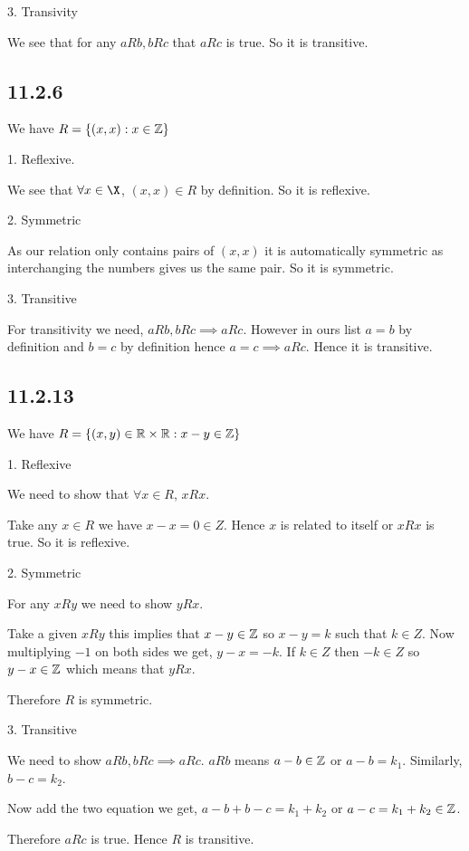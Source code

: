 \documentclass[a4paper]{report}
\begin{document}
3. Transivity

We see that for any $aRb, bRc$  that $aRc$ is true. So it is transitive. 


\subsection*{11.2.6}
We have $R = \{(x,x): x \in \mathbb{Z}\}$

1. Reflexive.

We see that  $\forall x \in \X$, $(x,x) \in R$ by definition. So it is reflexive.

2. Symmetric

As our relation only contains pairs of $(x,x)$ it is automatically symmetric as interchanging the numbers gives us the same pair. So it is symmetric.

3. Transitive

For transitivity we need, $aRb, bRc \implies aRc$. However in ours list $a = b$ by definition and $b = c$ by definition hence $a= c \implies aRc$. Hence it is transitive.

\subsection*{11.2.13}
We have $R = \{(x,y) \in \mathbb{R} \times  \mathbb{R} : x - y  \in \mathbb{Z}\}$

1. Reflexive

We need to show that $\forall x \in R$, $xRx$. 

Take any  $x \in R$ we have $x - x = 0 \in Z$. Hence $x$ is  related to itself or $xRx$ is true. So it is reflexive.

2. Symmetric

For any $xRy$ we need to show  $yRx$.

Take a given  $xRy$ this implies that $x - y \in \mathbb{Z}$ so  $x - y = k$ such that  $k \in Z$. Now multiplying  $-1$ on both sides we get, $y - x = -k$. If  $ k \in Z $ then $ -k \in Z$ so $y -x \in \mathbb{Z}$ which means that $yRx$.

Therefore  $R$ is symmetric.

3. Transitive

We need to show $aRb, bRc \implies aRc$. $aRb$ means $a - b \in \mathbb{Z}$ or $a - b = k_1$. Similarly, $b - c = k_2$.

Now add the two equation we get, $a - b + b - c = k_1 + k_2$ or $a - c = k_1 + k_2 \in \mathbb{Z}$. 

Therefore $aRc$ is true. Hence $R$ is transitive.
\end{document}
